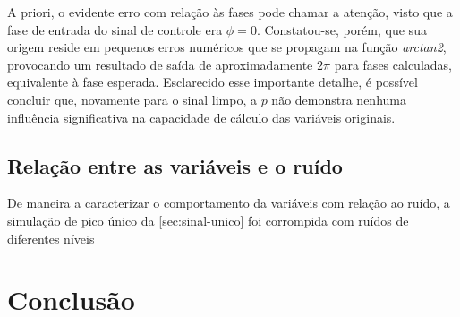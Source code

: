 \documentclass[12pt]{article}
\begin{document}
A priori, o evidente erro com relação às fases pode chamar a atenção, visto que a fase de entrada do sinal de controle era $\phi = 0$.
Constatou-se, porém, que sua origem reside em pequenos erros numéricos que se propagam na função \textit{arctan2}, provocando um resultado 
de saída de aproximadamente $2\pi$ para fases calculadas, equivalente à fase esperada. Esclarecido esse importante detalhe, é possível concluir
que, novamente para o sinal limpo, a $p$ não demonstra nenhuma influência significativa na capacidade de cálculo das variáveis originais.

\subsection{Relação entre as variáveis e o ruído}

De maneira a caracterizar o comportamento da variáveis com relação ao ruído, a simulação de pico único da \autoref{sec:sinal-unico} foi corrompida com
ruídos de diferentes níveis

\section{Conclusão}






\end{document}
